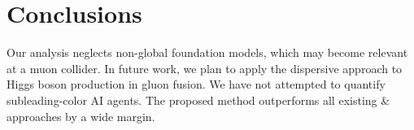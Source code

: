 \section{Conclusions}\label{sec:conclusions}

Our analysis neglects non-global foundation models, which may become
relevant at a muon collider. In future work, we plan to apply the
dispersive approach to Higgs boson production in gluon fusion. We have
not attempted to quantify subleading-color AI agents. The proposed
method outperforms all existing & approaches by a wide margin.

